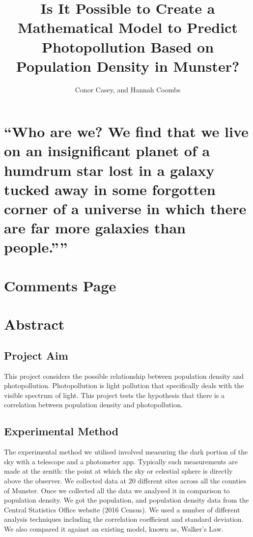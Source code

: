 \documentclass[12pt]{titlepage}
\title{Is It Possible to Create a Mathematical Model to Predict Photopollution Based on Population Density in Munster?}
\author{Conor Casey, and Hannah Coombs}
\begin{document}
\maketitle

\clearpage\mbox{}\clearpage


\chapter*{
\centering
    ``Who are we? We find that we live on an insignificant planet of a humdrum star
lost in a galaxy tucked away in some forgotten corner of a universe
in which there are far more galaxies than people.”''
\\[5pt]
}

\chapter*{Comments Page}

\chapter*{Abstract}
\section*{Project Aim} 
This project considers the possible relationship between population density and photopollution. Photopollution is light pollution that specifically deals with the visible spectrum of light. This project tests the hypothesis that there is a correlation between population density and photopollution.  

\section*{Experimental Method} 
The experimental method we utilised involved measuring the dark portion of the sky with a telescope and a photometer app. Typically such measurements are made at the zenith: the point at which the sky or celestial sphere is directly above the observer. We collected data at 20 different sites across all the counties of Munster. Once we collected all the data we analysed it in comparison to population density. We got the population, and population density data from the Central Statistics Office website (2016 Census). We used a number of different analysis techniques including the correlation coefficient and standard deviation. We also compared it against an existing model, known as, Walker's Law.  
\end{document}
